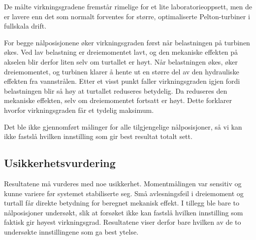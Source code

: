 De målte virkningsgradene fremstår rimelige for et lite laboratorieoppsett, men de er lavere enn det som normalt forventes for større, optimaliserte Pelton-turbiner i fullskala drift.

For begge nålposisjonene øker virkningsgraden først når belastningen på turbinen økes. Ved lav belastning er dreiemomentet lavt, og den mekaniske effekten på akselen blir derfor liten selv om turtallet er høyt. Når belastningen økes, øker dreiemomentet, og turbinen klarer å hente ut en større del av den hydrauliske effekten fra vannstrålen. Etter et visst punkt faller virkningsgraden igjen fordi belastningen blir så høy at turtallet reduseres betydelig. Da reduseres den mekaniske effekten, selv om dreiemomentet fortsatt er høyt. Dette forklarer hvorfor virkningsgraden får et tydelig maksimum.

Det ble ikke gjennomført målinger for alle tilgjengelige nålposisjoner, så vi kan ikke fastslå hvilken innstilling som gir best resultat totalt sett.

\subsection{Usikkerhetsvurdering}

Resultatene må vurderes med noe usikkerhet. Momentmålingen var sensitiv og kunne variere før systemet stabiliserte seg. Små avlesningsfeil i dreiemoment og turtall får direkte betydning for beregnet mekanisk effekt. I tillegg ble bare to nålposisjoner undersøkt, slik at forsøket ikke kan fastslå hvilken innstilling som faktisk gir høyest virkningsgrad. Resultatene viser derfor bare hvilken av de to undersøkte innstillingene som ga best ytelse.
